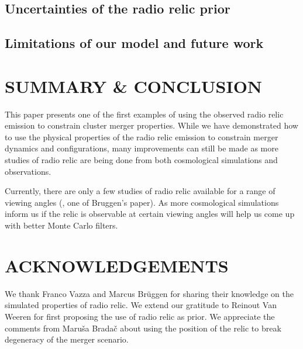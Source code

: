 \subsection{Uncertainties of the radio relic prior}


\subsection{Limitations of our model and future work} 



\section{SUMMARY \& CONCLUSION}
This paper presents one of the first examples of using the observed radio
relic emission to constrain cluster merger properties.
While we have demonstrated how to use the physical properties of the radio
relic emission to constrain merger dynamics and configurations, many
improvements can still be made as more studies of radio relic are being
done from both cosmological simulations and observations.

Currently, there are only a few studies of
 radio relic available for a range of viewing angles (\citealt{S13}, one of
Bruggen's paper). As more cosmological simulations inform us  
if the relic is observable at certain viewing angles will help us 
come up with better Monte Carlo filters. 

\section{ACKNOWLEDGEMENTS}
We thank Franco Vazza and Marcus Br\"{u}ggen for sharing their knowledge on
the simulated properties of radio relic. We
extend our gratitude to Reinout Van Weeren for first proposing the use of
radio relic as prior. We appreciate the comments from Maru\v{s}a
Brada\v{c} about using the position of the relic to break degeneracy
of the merger scenario. 





\appendix

